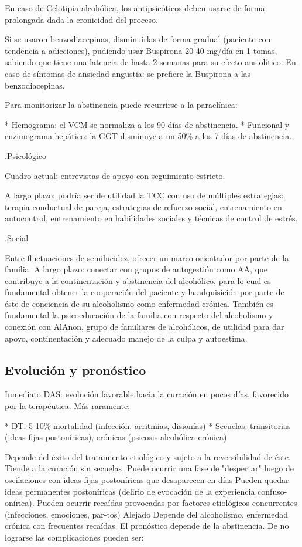 \documentclass{scrbook}
\begin{document}
En caso de Celotipia alcohólica, los antipsicóticos deben usarse de forma prolongada dada la cronicidad del proceso.

Si se usaron benzodiacepinas, disminuirlas de forma gradual (paciente con tendencia a adicciones), pudiendo usar Buspirona 20-40 mg/día en 1 tomas, sabiendo que tiene una latencia de hasta 2 semanas para su efecto ansiolítico. En caso de síntomas de ansiedad-angustia: se prefiere la Buspirona a las benzodiacepinas.

Para monitorizar la abstinencia puede recurrirse a la paraclínica:

* Hemograma: el VCM se normaliza a los 90 días de abstinencia.
* Funcional y enzimograma hepático: la GGT disminuye a un 50\% a los 7 días de abstinencia.

.Psicológico

Cuadro actual: entrevistas de apoyo con seguimiento estricto.

A largo plazo: podría ser de utilidad la TCC con uso de múltiples estrategias: terapia conductual de pareja, estrategias de refuerzo social, entrenamiento en autocontrol, entrenamiento en habilidades sociales y técnicas de control de estrés.

.Social

Entre fluctuaciones de semilucidez, ofrecer un marco orientador por parte de la familia. A largo plazo: conectar con grupos de autogestión como AA, que contribuye a la continentación y abstinencia del alcohólico, para lo cual es fundamental obtener la cooperación del paciente y la adquisición por parte de éste de conciencia de su alcoholismo como enfermedad crónica. También es fundamental la psicoeducación de la familia con respecto del alcoholismo y conexión con AlAnon, grupo de familiares de alcohólicos, de utilidad para dar apoyo, continentación y adecuado manejo de la culpa y autoestima.

\subsection*{Evolución y pronóstico}

Inmediato DAS: evolución favorable hacia la curación en pocos días, favorecido por la terapéutica. Más raramente:

* DT: 5-10\% mortalidad (infección, arritmias, disionías)
* Secuelas: transitorias (ideas fijas postoníricas), crónicas (psicosis alcohólica crónica)

Depende del éxito del tratamiento etiológico y sujeto a la reversibilidad de éste. Tiende a la curación sin secuelas. Puede ocurrir una fase de "despertar" luego de oscilaciones con ideas fijas postoníricas que desaparecen en días Pueden quedar ideas permanentes postoníricas (delirio de evocación de la experiencia confuso-onírica). Pueden ocurrir recaídas provocadas por factores etiológicos concurrentes (infecciones, emociones, par-tos) Alejado Depende del alcoholismo, enfermedad crónica con frecuentes recaídas. El pronóstico depende de la abstinencia. De no lograrse las complicaciones pueden ser:
\end{document}
